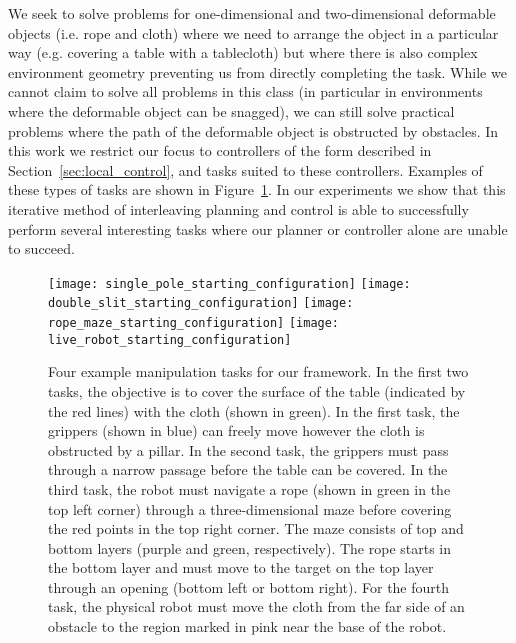 We seek to solve problems for one-dimensional and two-dimensional deformable objects (i.e. rope and cloth) where we need to arrange the object in a particular way (e.g. covering a table with a tablecloth) but where there is also complex environment geometry preventing us from directly completing the task. While we cannot claim to solve all problems in this class (in particular in environments where the deformable object can be snagged), we can still solve practical problems where the path of the deformable object is obstructed by obstacles. In this work we restrict our focus to controllers of the form described in Section~\ref{sec:local_control}, and tasks suited to these controllers. Examples of these types of tasks are shown in Figure~\ref{fig:example_tasks}. In our experiments we show that this iterative method of interleaving planning and control is able to successfully perform several interesting tasks where our planner or controller alone are unable to succeed.

\begin{figure}[h]
    \centering
    \texttt{[image: single\_pole\_starting\_configuration]}\hfill
    \texttt{[image: double\_slit\_starting\_configuration]}\hfill
    \texttt{[image: rope\_maze\_starting\_configuration]}\hfill
    \texttt{[image: live\_robot\_starting\_configuration]}%
    \caption{Four example manipulation tasks for our framework. In the first two tasks, the objective is to cover the surface of the table (indicated by the red lines) with the cloth (shown in green). In the first task, the grippers (shown in blue) can freely move however the cloth is obstructed by a pillar. In the second task, the grippers must pass through a narrow passage before the table can be covered. In the third task, the robot must navigate a rope (shown in green in the top left corner) through a three-dimensional maze before covering the red points in the top right corner. The maze consists of top and bottom layers (purple and green, respectively). The rope starts in the bottom layer and must move to the target on the top layer through an opening (bottom left or bottom right). For the fourth task, the physical robot must move the cloth from the far side of an obstacle to the region marked in pink near the base of the robot.}
    \label{fig:example_tasks}
\end{figure}

